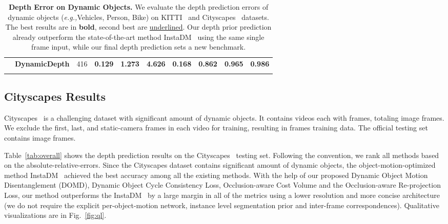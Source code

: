 \documentclass[runningheads]{llncs}
\newcommand{\eg}{\textit{e.g.,}}
\begin{document}
\begin{table*}[t]
{\begin{tabular}{|c|l|c||a|c|c|c|c|c|c|}
&\textbf{DynamicDepth}   &  416 &\textbf{0.129}  &\textbf{1.273}  &\textbf{4.626}  &\textbf{0.168}  &\textbf{0.862}  &\textbf{0.965}  &\textbf{0.986} \\

    \hline
  \end{tabular}
  }
\caption{\textbf{Depth Error on Dynamic Objects.} We evaluate the depth prediction errors of dynamic objects (\eg Vehicles, Person, Bike) on KITTI~\cite{kitti} and Cityscapes~\cite{Cityscapes} datasets. The best results are in \textbf{bold}, second best are \underline{underlined}. Our depth prior prediction  already outperform the state-of-the-art method InstaDM~\cite{instadm} using the same single frame input, while our final depth prediction  sets a new benchmark.}
  
\label{tab:doj}
\end{table*}



\subsection{Cityscapes Results}
 Cityscapes~\cite{Cityscapes}  is a challenging dataset with significant amount of dynamic objects. It contains  videos each with  frames, totaling   image frames. We exclude the first, last, and static-camera frames in each video for training, resulting in  frames training data. The official testing set contains  image frames. 

Table~\ref{tab:overall} shows the depth prediction results on the Cityscapes~\cite{Cityscapes} testing set. Following the convention, we rank all methods based on the absolute-relative-errors. Since the Cityscapes dataset contains significant amount of dynamic objects, the object-motion-optimized method InstaDM~\cite{instadm} achieved the best accuracy among all the existing methods. With the help of our proposed Dynamic Object Motion Disentanglement (DOMD), Dynamic Object Cycle Consistency Loss, Occlusion-aware Cost Volume and the Occlusion-aware Re-projection Loss, our method outperforms the InstaDM~\cite{instadm} by a large margin in all of the metrics using a lower resolution and more concise architecture (we do not require the explicit per-object-motion network, instance level segmentation prior and inter-frame correspondences). Qualitative visualizations are in Fig.~\ref{fig:ql}.
\end{document}
